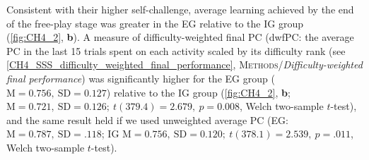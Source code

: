 Consistent with their higher self-challenge, average learning achieved by the end of the free-play stage was greater in the \ac{EG} relative to the \ac{IG} group (\cref{fig:CH4_2}, \textbf{b}). A measure of difficulty-weighted final \ac{PC} (\ac{dwfPC}: the average \ac{PC} in the last 15 trials spent on each activity scaled by its difficulty rank (see \cref{CH4_SSS_difficulty_weighted_final_performance}, \textsc{Methods}/\textit{Difficulty-weighted final performance}) was significantly higher for the \ac{EG} group ($\text{M} = 0.756,\ \text{SD} = 0.127$) relative to the \ac{IG} group (\cref{fig:CH4_2}, \textbf{b}; $\text{M} = 0.721,\ \text{SD} = 0.126;\ t(379.4) = 2.679,\ p = 0.008$, Welch two-sample $t$-test), and the same result held if we used unweighted average PC (\ac{EG}: $\text{M}=0.787,\ \text{SD}=.118$; \ac{IG} $\text{M}=0.756,\ \text{SD}=0.120;\ t(378.1) = 2.539,\ p = .011$, Welch two-sample $t$-test). 

